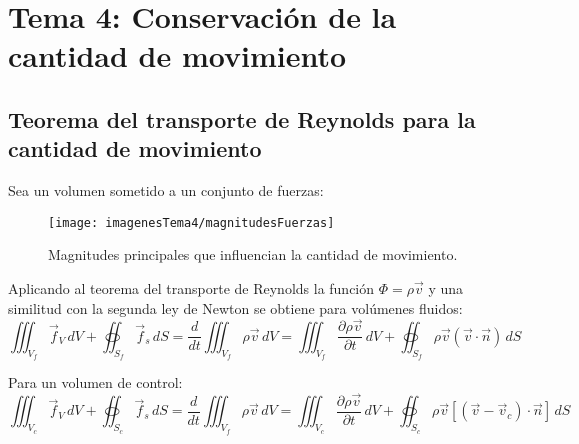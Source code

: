 \section{Tema 4: Conservación de la cantidad de movimiento}
\subsection{Teorema del transporte de Reynolds para la cantidad de movimiento}
Sea un volumen sometido a un conjunto de fuerzas:
\begin{figure}[H]
	\centering
	\texttt{[image: imagenesTema4/magnitudesFuerzas]}
	\caption{Magnitudes principales que influencian la cantidad de movimiento.}
	\label{fig:magnitudesfuerzas}
\end{figure}

Aplicando al teorema del transporte de Reynolds la función $\Phi=\rho\vec{v}$ y una similitud con la segunda ley de Newton se obtiene para volúmenes fluidos:
\[\iiint_{V_f}\vec{f}_V\,dV+\oiint_{S_f}\vec{f}_s\,dS=
\frac{d}{dt}\iiint_{V_f}\rho\vec{v}\,dV=
\iiint_{V_f}\frac{\partial \rho\vec{v}}{\partial t}\,dV+\oiint_{S_f}\rho\vec{v}\left(\vec{v}\cdot\vec{n}\right)\,dS\]

Para un volumen de control:
\[\iiint_{V_c}\vec{f}_V\,dV+\oiint_{S_c}\vec{f}_s\,dS=
\frac{d}{dt}\iiint_{V_f}\rho\vec{v}\,dV=
\iiint_{V_c}\frac{\partial \rho\vec{v}}{\partial t}\,dV
+\oiint_{S_c}\rho\vec{v}\left[\left(\vec{v}-\vec{v}_c\right)\cdot\vec{n}\right]\,dS\]

